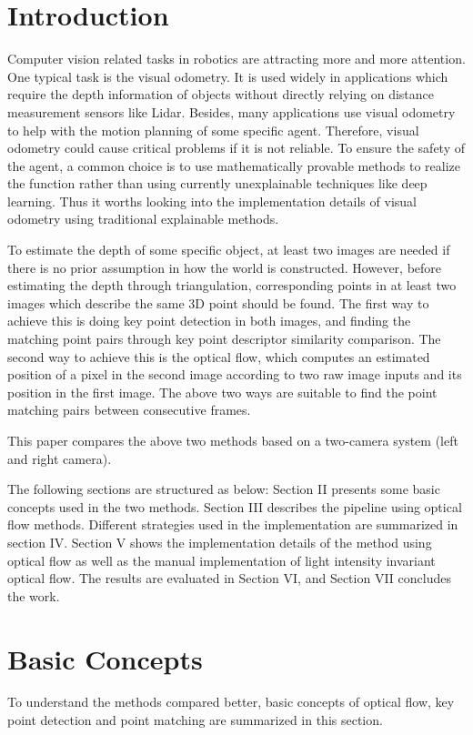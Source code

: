 \documentclass[11pt]{easychair}
\begin{document}
\section{Introduction}
Computer vision related tasks in robotics are attracting more and more attention. One typical task is the visual odometry. It is used widely in applications which require the depth information of objects without directly relying on distance measurement sensors like Lidar. Besides, many applications use visual odometry to help with the motion planning of some specific agent. Therefore, visual odometry could cause critical problems if it is not reliable. To ensure the safety of the agent, a common choice is to use mathematically provable methods to realize the function rather than using currently unexplainable techniques like deep learning. Thus it worths looking into the implementation details of visual odometry using traditional explainable methods.

To estimate the depth of some specific object, at least two images are needed if there is no prior assumption in how the world is constructed. However, before estimating the depth through triangulation, corresponding points in at least two images which describe the same 3D point should be found. The first way to achieve this is doing key point detection in both images, and finding the matching point pairs through key point descriptor similarity comparison. The second way to achieve this is the optical flow, which computes an estimated position of a pixel in the second image according to two raw image inputs and its position in the first image. The above two ways are suitable to find the point matching pairs between consecutive frames. 

This paper compares the above two methods based on a two-camera system (left and right camera).

The following sections are structured as below: Section II presents some basic concepts used in the two methods. Section III describes the pipeline using optical flow methods. Different strategies used in the implementation are summarized in section IV. Section V shows the implementation details of the method using optical flow as well as the manual implementation of light intensity invariant optical flow. The results are evaluated in Section VI, and Section VII concludes the work.


\section{Basic Concepts}
To understand the methods compared better, basic concepts of optical flow, key point detection and point matching are summarized in this section.
\end{document}
